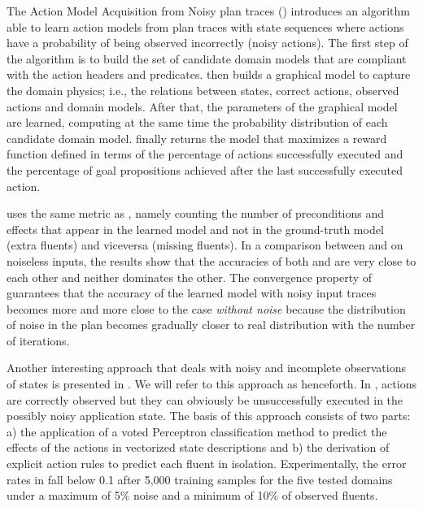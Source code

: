 The Action Model Acquisition from Noisy plan traces (\textbf{\AMAN}) \cite{zhuo2013action} introduces an algorithm able to learn action models from plan traces with \NO state sequences where actions have a probability of being observed incorrectly (noisy actions). The first step of the \AMAN algorithm is to build the set of candidate domain models that are compliant with the action headers and predicates. \AMAN then builds a graphical model to capture the domain physics; i.e., the relations between states, correct actions, observed actions and domain models. After that, the parameters of the graphical model are learned, computing at the same time the probability distribution of each candidate domain model. \AMAN finally returns the model that maximizes a reward function defined in terms of the percentage of actions successfully executed and the percentage of goal propositions achieved after the last successfully executed action.

\AMAN uses the same metric as \LAMP, namely counting the number of preconditions and effects that appear in the learned model and not in the ground-truth model (extra fluents) and viceversa (missing fluents). In a comparison between \AMAN and \ARMS on noiseless inputs, the results show that the accuracies of both \AMAN and \ARMS are very close to each other and neither dominates the other. The convergence property of \AMAN guarantees that the accuracy of the learned model with noisy input traces becomes more and more close to the case  \emph{without noise} because the distribution of noise in the plan becomes gradually closer to real distribution with the number of iterations.


Another interesting approach that deals with noisy and incomplete observations of states is presented in \cite{MouraoZPS12}. We will refer to this approach as \textbf{\NOISTA} henceforth. In \NOISTA, actions are correctly observed but they can obviously be unsuccessfully executed in the possibly noisy application state. The basis of this approach consists of two parts: a) the application of a voted Perceptron classification method to predict the effects of the actions in vectorized state descriptions and b) the derivation of explicit \strips \texttt{} action rules to predict each fluent in isolation. Experimentally, the error rates in \NOISTA fall below 0.1 after 5,000 training samples for the five tested domains under a maximum of 5\% noise and a minimum of 10\% of observed fluents.


